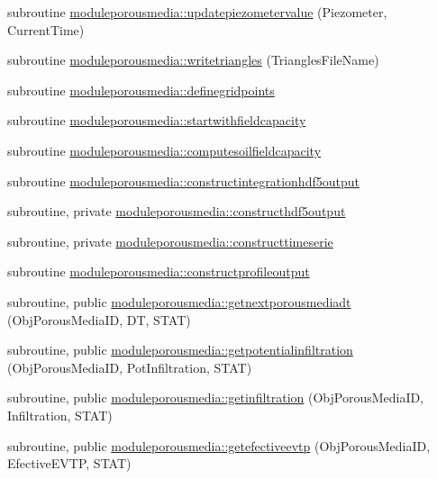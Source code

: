 \begin{DoxyCompactItemize}
\item 
subroutine \mbox{\hyperlink{namespacemoduleporousmedia_a800f0d4d8cd48ad329f33e9bb42015a7}{moduleporousmedia\+::updatepiezometervalue}} (Piezometer, Current\+Time)
\item 
subroutine \mbox{\hyperlink{namespacemoduleporousmedia_a9df397532d5ac8a58a2087f07677d385}{moduleporousmedia\+::writetriangles}} (Triangles\+File\+Name)
\item 
subroutine \mbox{\hyperlink{namespacemoduleporousmedia_a85940000a15a4caa7221748c12a655c6}{moduleporousmedia\+::definegridpoints}}
\item 
subroutine \mbox{\hyperlink{namespacemoduleporousmedia_af2c381d3df927d5f0eb263a6fe3b13a7}{moduleporousmedia\+::startwithfieldcapacity}}
\item 
subroutine \mbox{\hyperlink{namespacemoduleporousmedia_a5bc710495ce11815ae382078999351b3}{moduleporousmedia\+::computesoilfieldcapacity}}
\item 
subroutine \mbox{\hyperlink{namespacemoduleporousmedia_ad4d7e80e82397566cbd292b6c16a78f8}{moduleporousmedia\+::constructintegrationhdf5output}}
\item 
subroutine, private \mbox{\hyperlink{namespacemoduleporousmedia_a222cfa7f29b1db2fb4ab637f6c27c28e}{moduleporousmedia\+::constructhdf5output}}
\item 
subroutine, private \mbox{\hyperlink{namespacemoduleporousmedia_adba23be00c82f6436627807a223113c5}{moduleporousmedia\+::constructtimeserie}}
\item 
subroutine \mbox{\hyperlink{namespacemoduleporousmedia_a4c55632f6a1d6b5ff5769ca1ae4a1f74}{moduleporousmedia\+::constructprofileoutput}}
\item 
subroutine, public \mbox{\hyperlink{namespacemoduleporousmedia_a97ffb3238bf0364c7e0c3e30fe5b7021}{moduleporousmedia\+::getnextporousmediadt}} (Obj\+Porous\+Media\+ID, DT, S\+T\+AT)
\item 
subroutine, public \mbox{\hyperlink{namespacemoduleporousmedia_aa235c3281ca1f6104396eec860cafc63}{moduleporousmedia\+::getpotentialinfiltration}} (Obj\+Porous\+Media\+ID, Pot\+Infiltration, S\+T\+AT)
\item 
subroutine, public \mbox{\hyperlink{namespacemoduleporousmedia_ad1bd34c459069a631831974e49b7bb8c}{moduleporousmedia\+::getinfiltration}} (Obj\+Porous\+Media\+ID, Infiltration, S\+T\+AT)
\item 
subroutine, public \mbox{\hyperlink{namespacemoduleporousmedia_a2706d0d1284873eb1538b17e9b347d9a}{moduleporousmedia\+::getefectiveevtp}} (Obj\+Porous\+Media\+ID, Efective\+E\+V\+TP, S\+T\+AT)

\end{DoxyCompactItemize}
